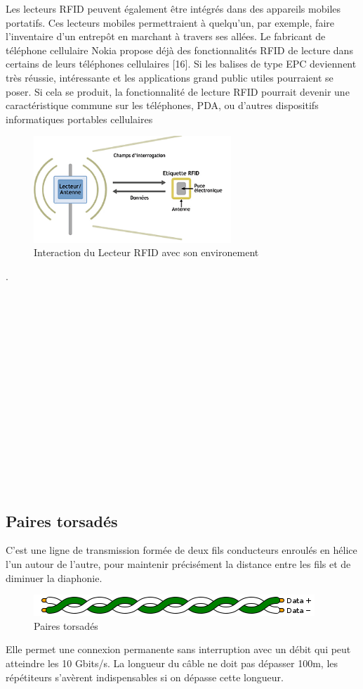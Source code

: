 \documentclass[11pt, a4paper, twoside]{book}
\begin{document}
Les lecteurs RFID peuvent également être intégrés dans des appareils mobiles portatifs. Ces lecteurs mobiles permettraient à quelqu'un, par exemple, faire l'inventaire d'un entrepôt en marchant à travers ses allées. Le fabricant de téléphone cellulaire Nokia propose déjà des fonctionnalités RFID de lecture dans certains de leurs téléphones cellulaires [16]. Si les balises de type EPC deviennent très réussie, intéressante et les applications grand public utiles pourraient se poser. Si cela se produit, la fonctionnalité de lecture RFID pourrait devenir une caractéristique commune sur les téléphones, PDA, ou d'autres dispositifs informatiques portables cellulaires
\begin{figure}[h!]
\centering
\includegraphics[height=4cm]{reader}
\caption{Interaction du Lecteur RFID avec son environement}
\end{figure}
.\\\\\\\\\\\\\\\\\\\\\\\\\\\\\\\

\subsection{Paires torsadés}
C’est une ligne de transmission formée de deux fils conducteurs enroulés en hélice l’un autour de l’autre, pour maintenir précisément la distance entre les fils et de diminuer la diaphonie.
\begin{figure}[h!]
\centering
\includegraphics[width=\textwidth]{twistedPair}
\caption{Paires torsadés}
\end{figure}
Elle permet une connexion permanente sans interruption avec un débit qui peut atteindre les 10 Gbits/s. La longueur du câble ne doit pas dépasser 100m, les répétiteurs s'avèrent indispensables si on dépasse cette longueur.
\end{document}
